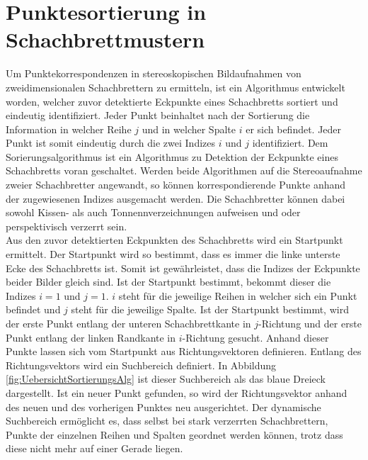 \chapter{Punktesortierung in Schachbrettmustern}
\label{sec:schachbrettAlg} 


Um Punktekorrespondenzen in stereoskopischen Bildaufnahmen von zweidimensionalen Schachbrettern zu ermitteln, ist ein Algorithmus entwickelt worden, welcher zuvor detektierte Eckpunkte eines Schachbretts sortiert und eindeutig identifiziert. Jeder Punkt beinhaltet nach der Sortierung die Information in welcher Reihe $j$ und in welcher Spalte $i$ er sich befindet. Jeder Punkt ist somit eindeutig durch die zwei Indizes $i$ und $j$ identifiziert. Dem Sorierungsalgorithmus ist ein Algorithmus zu Detektion der Eckpunkte eines Schachbretts voran geschaltet. Werden beide Algorithmen auf die Stereoaufnahme zweier Schachbretter angewandt, so können korrespondierende Punkte anhand der zugewiesenen Indizes ausgemacht werden. Die Schachbretter können dabei sowohl Kissen- als auch Tonnennverzeichnungen aufweisen und oder perspektivisch verzerrt sein.\\ 





Aus den zuvor detektierten Eckpunkten des Schachbretts wird ein Startpunkt ermittelt. Der Startpunkt wird so bestimmt, dass es immer die linke unterste Ecke des Schachbretts ist. Somit ist gewährleistet, dass die Indizes der Eckpunkte beider Bilder gleich sind. Ist der Startpunkt bestimmt, bekommt dieser die Indizes $i = 1$ und $j = 1$. $i$ steht für die jeweilige Reihen in welcher sich ein Punkt befindet und $j$ steht für die jeweilige Spalte. Ist der Startpunkt bestimmt, wird der erste Punkt entlang der unteren Schachbrettkante in $j$-Richtung und der erste Punkt entlang der linken Randkante in $i$-Richtung gesucht. Anhand dieser Punkte lassen sich vom Startpunkt aus Richtungsvektoren definieren. Entlang des Richtungsvektors wird ein Suchbereich definiert. In Abbildung \ref{fig:UebersichtSortierungsAlg} ist dieser Suchbereich als das blaue Dreieck dargestellt. Ist ein neuer Punkt gefunden, so wird der Richtungsvektor anhand des neuen und des vorherigen Punktes neu ausgerichtet. Der dynamische Suchbereich ermöglicht es, dass selbst bei stark verzerrten Schachbrettern, Punkte der einzelnen Reihen und Spalten geordnet werden können, trotz dass diese nicht mehr auf einer Gerade liegen.

